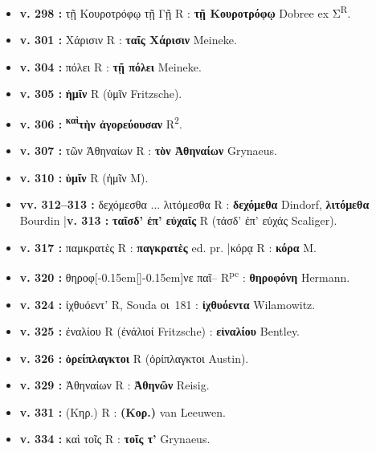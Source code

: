 \documentclass[10pt, a4paper, twoside]{book}
\renewcommand{\_}{\origunderscore\penalty0\relax}
\providecommand{\lecon}[1]{\textbf{#1}}
\providecommand{\expo}[1]{\textsuperscript{#1}}
\providecommand{\Rpc}{R\expo{pc}}
\providecommand{\Rdeux}{R\expo{2}}
\providecommand{\Mon}{M}
\providecommand{\espApp}{\hspace{0.5em}|\hspace{0.5em}}
\providecommand{\inRas}[2]{[\kern-0.15em[\text{#1}]\kern-0.15em]\text{#2}}
\begin{document}
\begin{itemize}
\begin{itemize}
    \item \textbf{v. 298 :} τῇ Κουροτρόφῳ τῇ Γῇ R : \lecon{τῇ Κουροτρόφῳ} Dobree ex Σ\textsuperscript{R}.
    \item \textbf{v. 301 :} Χάρισιν R : \lecon{ταῖς Χάρισιν} Meineke.
    \item \textbf{v. 304 :} πόλει R : \lecon{τῇ πόλει} Meineke.
    \item \textbf{v. 305 :} \lecon{ἡμῖν} R (ὑμῖν Fritzsche).
    \item \textbf{v. 306 :} \lecon{\expo{καὶ}τὴν ἀγορεύουσαν} \Rdeux{}.
    \item \textbf{v. 307 :} τῶν Ἀθηναίων R : \lecon{τὸν Ἀθηναίων} Grynaeus.
    \item \textbf{v. 310 :} \lecon{ὑμῖν} R (ἡμῖν \Mon{}).
    \item \textbf{vv. 312–313 :} δεχόμεσθα ... λιτόμεσθα R : \lecon{δεχόμεθα} Dindorf, \lecon{λιτόμεθα} Bourdin \espApp \textbf{v. 313 :} \lecon{ταῖσδ' ἐπ' εὐχαῖς} R (τάσδ' ἐπ' εὐχάς Scaliger).
    \item \textbf{v. 317 :} παμκρατὲς R : \lecon{παγκρατὲς} ed. pr. \espApp κόρᾳ R : \lecon{κόρα} \Mon{}.
    \item \textbf{v. 320 :} θηροφ\inRas{ω}{ό}νε παῖ-- \Rpc{} : \lecon{θηροφόνη} Hermann.
    \item \textbf{v. 324 :} ἰχθυόεντ' R, Souda οι~181 : \lecon{ἰχθυόεντα} Wilamowitz.
    \item \textbf{v. 325 :} ἐναλίου R (ἐνάλιοί Fritzsche) : \lecon{εἰναλίου} Bentley.
    \item \textbf{v. 326 :} \lecon{ὀρείπλαγκτοι} R (ὀρίπλαγκτοι Austin).
    \item \textbf{v. 329 :} Ἀθηναίων R : \lecon{Ἀθηνῶν} Reisig.
    \item \textbf{v. 331 :} (Κηρ.) R : \lecon{(Κορ.)} van Leeuwen.
    \item \textbf{v. 334 :} καὶ τοῖς R : \lecon{τοῖς τ'} Grynaeus.
  \end{itemize}
\end{itemize}
\end{document}
